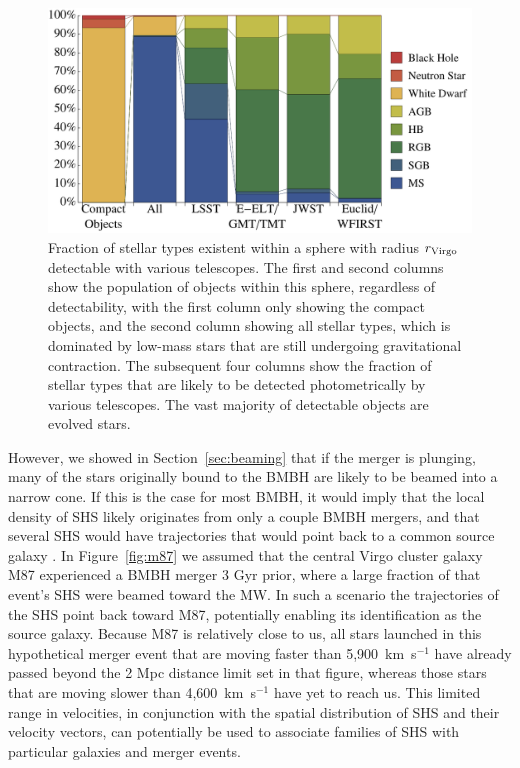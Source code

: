 \documentclass[a4paper,twocolumn]{emulateapj}
\begin{document}
{\begin{figure}
\centering\includegraphics[width=\linewidth,clip=true]{stagechart}
\caption{Fraction of stellar types existent within a sphere with radius $r_{\rm Virgo}$ detectable with various telescopes. The first and second columns show the population of objects within this sphere, regardless of detectability, with the first column only showing the compact objects, and the second column showing all stellar types, which is dominated by low-mass stars that are still undergoing gravitational contraction. The subsequent four columns show the fraction of stellar types that are likely to be detected photometrically by various telescopes. The vast majority of detectable objects are evolved stars.\smallskip}
\label{fig:stage}
\end{figure}

However, we showed in Section~\ref{sec:beaming} that if the merger is plunging, many of the stars originally bound to the BMBH are likely to be beamed into a narrow cone. If this is the case for most BMBH, it would imply that the local density of SHS likely originates from only a couple BMBH mergers, and that several SHS would have trajectories that would point back to a common source galaxy \citep{Holley-Bockelmann:2005a}. In Figure~\ref{fig:m87} we assumed that the central Virgo cluster galaxy M87 experienced a BMBH merger 3 Gyr prior, where a large fraction of that event's SHS were beamed toward the MW. In such a scenario the trajectories of the SHS point back toward M87, potentially enabling its identification as the source galaxy. Because M87 is relatively close to us, all stars launched in this hypothetical merger event that are moving faster than 5,900~km~s$^{-1}$ have already passed beyond the 2 Mpc distance limit set in that figure, whereas those stars that are moving slower than 4,600~km~s$^{-1}$ have yet to reach us. This limited range in velocities, in conjunction with the spatial distribution of SHS and their velocity vectors, can potentially be used to associate families of SHS with particular galaxies and merger events.

}
\end{document}
